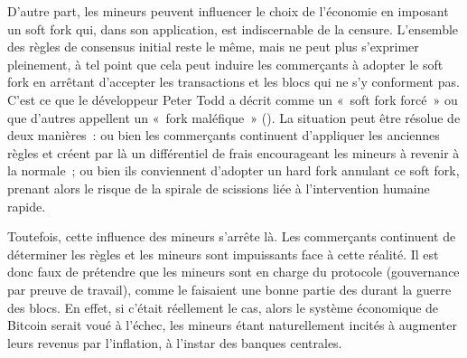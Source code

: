 D'autre part, les mineurs peuvent influencer le choix de l'économie en imposant un soft fork qui, dans son application, est indiscernable de la censure. L'ensemble des règles de consensus initial reste le même, mais ne peut plus s'exprimer pleinement, à tel point que cela peut induire les commerçants à adopter le soft fork en arrêtant d'accepter les transactions et les blocs qui ne s'y conforment pas. C'est ce que le développeur Peter Todd a décrit comme un «~soft fork forcé~» ou que d'autres appellent un «~fork maléfique~» (). La situation peut être résolue de deux manières~: ou bien les commerçants continuent d'appliquer les anciennes règles et créent par là un différentiel de frais encourageant les mineurs à revenir à la normale~; ou bien ils conviennent d'adopter un hard fork annulant ce soft fork, prenant alors le risque de la spirale de scissions liée à l'intervention humaine rapide.

Toutefois, cette influence des mineurs s'arrête là. Les commerçants continuent de déterminer les règles et les mineurs sont impuissants face à cette réalité. Il est donc faux de prétendre que les mineurs sont en charge du protocole (gouvernance par preuve de travail), comme le faisaient une bonne partie des  durant la guerre des blocs. En effet, si c'était réellement le cas, alors le système économique de Bitcoin serait voué à l'échec, les mineurs étant naturellement incités à augmenter leurs revenus par l'inflation, à l'instar des banques centrales.

